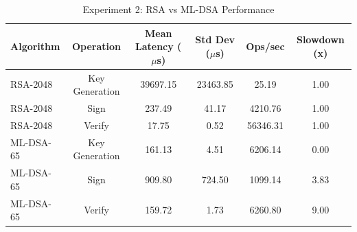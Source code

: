 \begin{table}
\caption{Experiment 2: RSA vs ML-DSA Performance}
\label{tab:exp2}
\begin{tabular}{lccccc}
\toprule
Algorithm & Operation & Mean Latency ($\mu$s) & Std Dev ($\mu$s) & Ops/sec & Slowdown (x) \\
\midrule
RSA-2048 & Key Generation & 39697.15 & 23463.85 & 25.19 & 1.00 \\
RSA-2048 & Sign & 237.49 & 41.17 & 4210.76 & 1.00 \\
RSA-2048 & Verify & 17.75 & 0.52 & 56346.31 & 1.00 \\
ML-DSA-65 & Key Generation & 161.13 & 4.51 & 6206.14 & 0.00 \\
ML-DSA-65 & Sign & 909.80 & 724.50 & 1099.14 & 3.83 \\
ML-DSA-65 & Verify & 159.72 & 1.73 & 6260.80 & 9.00 \\
\bottomrule
\end{tabular}
\end{table}
